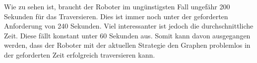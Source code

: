 Wie zu sehen ist, braucht der Roboter im ungünstigsten Fall ungefähr 200 Sekunden für das Traversieren. Dies ist immer noch unter der geforderten Anforderung von 240 Sekunden. 
Viel interessanter ist jedoch die durchschnittliche Zeit. Diese fällt konstant unter 60 Sekunden aus.
Somit kann davon ausgegangen werden, dass der Roboter mit der aktuellen Strategie den Graphen problemlos in der geforderten Zeit erfolgreich traversieren kann.
